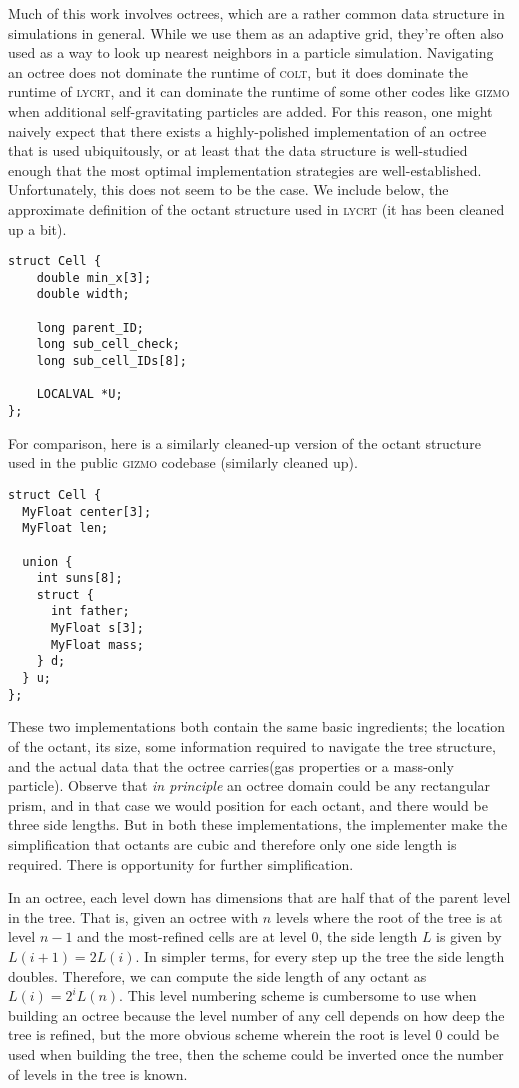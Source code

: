 Much of this work involves octrees, which are a rather common data structure in simulations in general.
While we use them as an adaptive grid, they're often also used as a way to look up nearest neighbors in a particle simulation.
Navigating an octree does not dominate the runtime of \textsc{colt}, but it does dominate the runtime of \textsc{lycrt}, and it can dominate the runtime of some other codes like \textsc{gizmo} when additional self-gravitating particles are added.
For this reason, one might naively expect that there exists a highly-polished implementation of an octree that is used ubiquitously, or at least that the data structure is well-studied enough that the most optimal implementation strategies are well-established.
Unfortunately, this does not seem to be the case.
We include below, the approximate definition of the octant structure used in \textsc{lycrt} (it has been cleaned up a bit).
\begin{lstlisting}
struct Cell {
    double min_x[3];
    double width;

    long parent_ID;
    long sub_cell_check;
    long sub_cell_IDs[8];

    LOCALVAL *U;
};
\end{lstlisting}
For comparison, here is a similarly cleaned-up version of the octant structure used in the public \textsc{gizmo} codebase (similarly cleaned up).
\begin{lstlisting}
struct Cell {
  MyFloat center[3];
  MyFloat len;

  union {
    int suns[8];
    struct {
      int father;
      MyFloat s[3];
      MyFloat mass;
    } d;
  } u;
};
\end{lstlisting}
These two implementations both contain the same basic ingredients; the location of the octant, its size, some information required to navigate the tree structure, and the actual data that the octree carries(gas properties or a mass-only particle).
Observe that \emph{in principle} an octree domain could be any rectangular prism, and in that case we would position for each octant, and there would be three side lengths.
But in both these implementations, the implementer make the simplification that octants are cubic and therefore only one side length is required.
There is opportunity for further simplification.

In an octree, each level down has dimensions that are half that of the parent level in the tree.
That is, given an octree with $n$ levels where the root of the tree is at level $n-1$ and the most-refined cells are at level $0$, the side length $L$ is given by $L(i+1) = 2L(i)$.
In simpler terms, for every step up the tree the side length doubles.
Therefore, we can compute the side length of any octant as $L(i) = 2^{i} L(n)$.
This level numbering scheme is cumbersome to use when building an octree because the level number of any cell depends on how deep the tree is refined, but the more obvious scheme wherein the root is level $0$ could be used when building the tree, then the scheme could be inverted once the number of levels in the tree is known.

